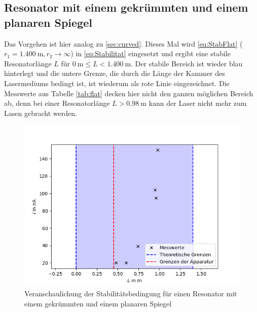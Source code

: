 \subsection{Resonator mit einem gekrümmten und einem planaren Spiegel}
Das Vorgehen ist hier analog zu \ref{sec:curved}. Dieses Mal wird \eqref{eq:StabFlat} ($r_1 = \SI{1.400}{\metre}, r_2\rightarrow\infty$) in \eqref{eq:Stabilitat} eingesetzt und ergibt eine stabile Resonatorlänge $L$ für $\SI{0}{\metre}\leq L<\SI{1.400}{\metre}$. Der stabile Bereich ist wieder blau hinterlegt und die untere Grenze, die durch die Länge der Kammer des Lasermediums bedingt ist, ist wiederum als rote Linie eingezeichnet. Die Messwerte aus Tabelle \ref{tab:flat} decken hier nicht den ganzen möglichen Bereich ab, denn bei einer Resonatorlänge $L>\SI{0.98}{\metre}$ kann der Laser nicht mehr zum Lasen gebracht werden.

\begin{figure}[h!]
	\centering
	\includegraphics[width=.7\textwidth]{PlotFlat2.png}
	\caption{Veranschaulichung der Stabilitätsbedingung für einen Resonator mit einem gekrümmten und einem planaren Spiegel}
	\label{fig:flat}
\end{figure}